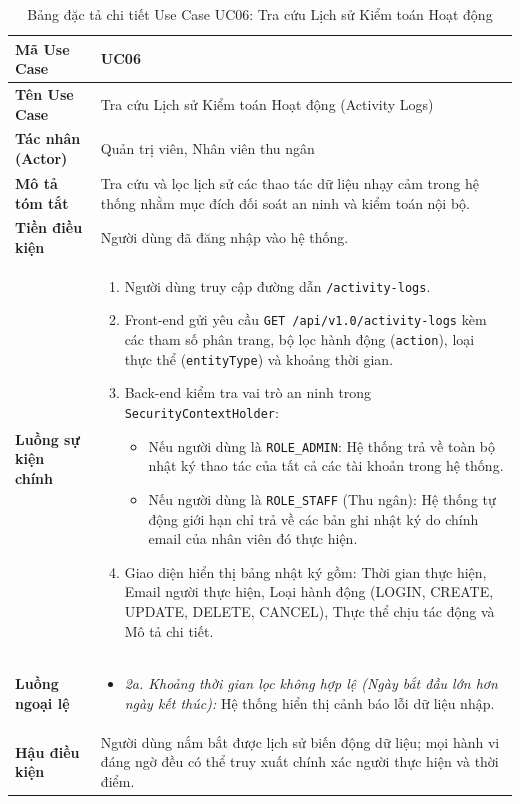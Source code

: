 \begin{table}[htbp]
\centering
\caption{Bảng đặc tả chi tiết Use Case UC06: Tra cứu Lịch sử Kiểm toán Hoạt động}
\label{tab:uc06_activity_log}
\vspace{2mm}
\begin{tabularx}{\textwidth}{|l|X|}
\hline
\textbf{Mã Use Case} & \textbf{UC06} \\ \hline
\textbf{Tên Use Case} & Tra cứu Lịch sử Kiểm toán Hoạt động (Activity Logs) \\ \hline
\textbf{Tác nhân (Actor)} & Quản trị viên, Nhân viên thu ngân \\ \hline
\textbf{Mô tả tóm tắt} & Tra cứu và lọc lịch sử các thao tác dữ liệu nhạy cảm trong hệ thống nhằm mục đích đối soát an ninh và kiểm toán nội bộ. \\ \hline
\textbf{Tiền điều kiện} & Người dùng đã đăng nhập vào hệ thống. \\ \hline
\textbf{Luồng sự kiện chính} & 
\begin{enumerate}[leftmargin=*, nosep]
    \item Người dùng truy cập đường dẫn \texttt{/activity-logs}.
    \item Front-end gửi yêu cầu \texttt{GET /api/v1.0/activity-logs} kèm các tham số phân trang, bộ lọc hành động (\texttt{action}), loại thực thể (\texttt{entityType}) và khoảng thời gian.
    \item Back-end kiểm tra vai trò an ninh trong \texttt{SecurityContextHolder}:
    \begin{itemize}
        \item Nếu người dùng là \texttt{ROLE\_ADMIN}: Hệ thống trả về toàn bộ nhật ký thao tác của tất cả các tài khoản trong hệ thống.
        \item Nếu người dùng là \texttt{ROLE\_STAFF} (Thu ngân): Hệ thống tự động giới hạn chỉ trả về các bản ghi nhật ký do chính email của nhân viên đó thực hiện.
    \end{itemize}
    \item Giao diện hiển thị bảng nhật ký gồm: Thời gian thực hiện, Email người thực hiện, Loại hành động (LOGIN, CREATE, UPDATE, DELETE, CANCEL), Thực thể chịu tác động và Mô tả chi tiết.
\end{enumerate} \\ \hline
\textbf{Luồng ngoại lệ} & 
\begin{itemize}[leftmargin=*, nosep]
    \item \textit{2a. Khoảng thời gian lọc không hợp lệ (Ngày bắt đầu lớn hơn ngày kết thúc):} Hệ thống hiển thị cảnh báo lỗi dữ liệu nhập.
\end{itemize} \\ \hline
\textbf{Hậu điều kiện} & Người dùng nắm bắt được lịch sử biến động dữ liệu; mọi hành vi đáng ngờ đều có thể truy xuất chính xác người thực hiện và thời điểm. \\ \hline
\end{tabularx}
\end{table}

